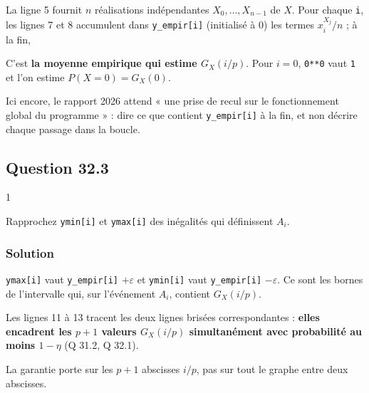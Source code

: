 \documentclass[11pt,a4paper]{article}
\newcommand{\equationajustee}[1]{%
  \sbox{\boiteequation}{$\displaystyle #1$}%
  \ifdim\wd\boiteequation>\linewidth
    \[\resizebox{\linewidth}{!}{\usebox{\boiteequation}}\]%
  \else
    \[#1\]%
  \fi}
\begin{document}
La ligne 5 fournit \(n\) réalisations indépendantes \(X_0,\dots,X_{n-1}\) de \(X\). Pour chaque \texttt{i}, les lignes 7 et 8 accumulent dans \texttt{y\_empir{[}i{]}} (initialisé à \(0\)) les termes \(x_i^{X_j}/n\) ; à la fin,

\equationajustee{\texttt{y\_empir[i]}=\frac1n\sum_{j=0}^{n-1}\Big(\frac ip\Big)^{X_j}.}

C'est \textbf{la moyenne empirique qui estime \(G_X(i/p)\)}. Pour \(i=0\), \texttt{0**0} vaut \texttt{1} et l'on estime \(P(X=0)=G_X(0)\).

\begin{jury}

Ici encore, le rapport 2026 attend « une prise de recul sur le fonctionnement global du programme » : dire ce que contient \texttt{y\_empir{[}i{]}} à la fin, et non décrire chaque passage dans la boucle.

\end{jury}

\hypertarget{question-32.3}{%
\subsection{Question 32.3}\label{question-32.3}}

\begin{indication}{1}

Rapprochez \texttt{ymin{[}i{]}} et \texttt{ymax{[}i{]}} des inégalités qui définissent \(A_i\).

\end{indication}

\hypertarget{solution-78}{%
\subsubsection{Solution}\label{solution-78}}

\texttt{ymax{[}i{]}} vaut \texttt{y\_empir{[}i{]}} \(+\varepsilon\) et \texttt{ymin{[}i{]}} vaut \texttt{y\_empir{[}i{]}} \(-\varepsilon\). Ce sont les bornes de l'intervalle qui, sur l'événement \(A_i\), contient \(G_X(i/p)\).

Les lignes 11 à 13 tracent les deux lignes brisées correspondantes : \textbf{elles encadrent les \(p+1\) valeurs \(G_X(i/p)\) simultanément avec probabilité au moins \(1-\eta\)} (Q 31.2, Q 32.1).

\begin{piege}

La garantie porte sur les \(p+1\) abscisses \(i/p\), pas sur tout le graphe entre deux abscisses.

\end{piege}
\end{document}
